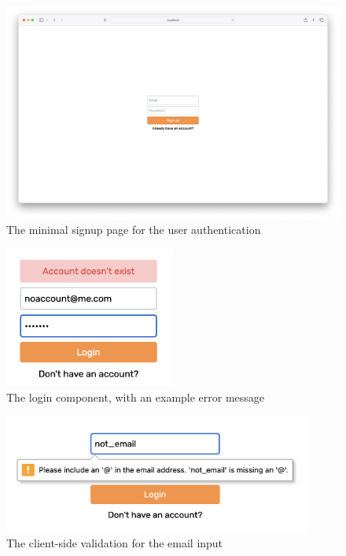\begin{figure}[H]
	\centering
	\includegraphics[width=\textwidth]{images/signup_page.png}
	\caption{The minimal signup page for the user authentication}
	\label{fig:Signup_page}
\end{figure}

\begin{figure}[H]
	\centering
	\includegraphics[width=0.5\textwidth]{images/no_account.png}
	\caption{The login component, with an example error message}
	\label{fig:Login_component}
\end{figure}

\begin{figure}[H]
	\centering
	\includegraphics[width=0.9\textwidth]{images/email_validation.png}
	\caption{The client-side validation for the email input}
	\label{fig:Email_validation}
\end{figure}

